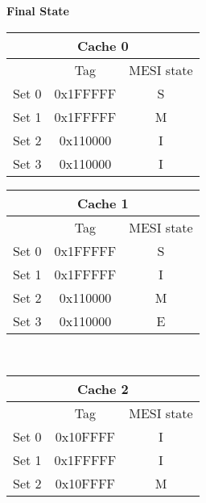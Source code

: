 \begin{center}
\textbf{Final State}
\\ \vspace{3mm}
\begin{tabular}{|ccc|}
\hline
\multicolumn{3}{|c|}{\textbf{Cache 0}}                                   \\ \hline
\multicolumn{1}{|c|}{}      & \multicolumn{1}{c|}{Tag}      & MESI state \\ \hline
\multicolumn{1}{|c|}{Set 0} & \multicolumn{1}{c|}{0x1FFFFF} & S          \\ \hline
\multicolumn{1}{|c|}{Set 1} & \multicolumn{1}{c|}{0x1FFFFF} & M          \\ \hline
\multicolumn{1}{|c|}{Set 2} & \multicolumn{1}{c|}{0x110000} & I          \\ \hline
\multicolumn{1}{|c|}{Set 3} & \multicolumn{1}{c|}{0x110000} & I          \\ \hline
\end{tabular}
\begin{tabular}{|ccc|}
\hline
\multicolumn{3}{|c|}{\textbf{Cache 1}}                                   \\ \hline
\multicolumn{1}{|c|}{}      & \multicolumn{1}{c|}{Tag}      & MESI state \\ \hline
\multicolumn{1}{|c|}{Set 0} & \multicolumn{1}{c|}{0x1FFFFF} & S          \\ \hline
\multicolumn{1}{|c|}{Set 1} & \multicolumn{1}{c|}{0x1FFFFF} & I          \\ \hline
\multicolumn{1}{|c|}{Set 2} & \multicolumn{1}{c|}{0x110000} & M          \\ \hline
\multicolumn{1}{|c|}{Set 3} & \multicolumn{1}{c|}{0x110000} & E          \\ \hline
\end{tabular}
\\ \vspace{1mm}
\begin{tabular}{|ccc|}
\hline
\multicolumn{3}{|c|}{\textbf{Cache 2}}                                   \\ \hline
\multicolumn{1}{|c|}{}      & \multicolumn{1}{c|}{Tag}      & MESI state \\ \hline
\multicolumn{1}{|c|}{Set 0} & \multicolumn{1}{c|}{0x10FFFF} & I          \\ \hline
\multicolumn{1}{|c|}{Set 1} & \multicolumn{1}{c|}{0x1FFFFF} & I          \\ \hline
\multicolumn{1}{|c|}{Set 2} & \multicolumn{1}{c|}{0x10FFFF} & M          \\ \hline

\end{tabular}
\end{center}
